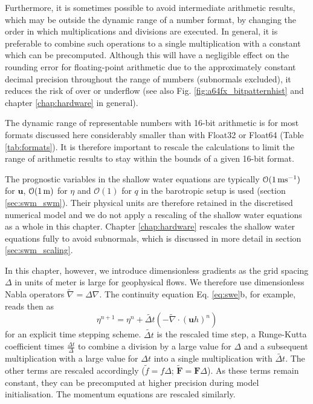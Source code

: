 Furthermore, it is sometimes possible to avoid intermediate arithmetic results, which may be outside the dynamic range of a number format,
by changing the order in which multiplications and divisions are executed. In general, it is preferable to combine such operations to a single
multiplication with a constant which can be precomputed. Although this will have a negligible effect on the rounding error for floating-point
arithmetic due to the approximately constant decimal precision throughout the range of numbers (subnormals excluded), it reduces the risk
of over or underflow (see also Fig. \ref{fig:a64fx_bitpatternhist} and chapter \ref{chap:hardware} in general).

The dynamic range of representable numbers with 16-bit arithmetic is for most formats discussed here considerably smaller than with
Float32 or Float64 (Table \ref{tab:formats}). It is therefore important to rescale the calculations to limit the range of arithmetic results to
stay within the bounds of a given 16-bit format.

The prognostic variables in the shallow water equations are typically $\mathcal{O}(1\operatorname{ms}^{-1})$ for $\mathbf{u}$, $\mathcal{O}(1\operatorname{m})$
for $\eta$ and $\mathcal{O}(1)$ for $q$ in the barotropic setup is used (section \ref{sec:swm_swm}). Their physical units are therefore retained
in the discretised numerical model and we do not apply a rescaling of the shallow water equations as a whole in this chapter. Chapter
\ref{chap:hardware} rescales the shallow water equations fully to avoid subnormals, which is discussed in more detail in section
\ref{sec:swm_scaling}.

In this chapter, however, we introduce dimensionless gradients as the grid spacing $\Delta$ in units of meter is large for geophysical flows.
We therefore use dimensionless Nabla operators $\tilde{\nabla} = \Delta\nabla$. The continuity equation Eq. \ref{eq:swe}b, for example,
reads then as
\begin{equation}
\eta^{n+1} = \eta^n + \tilde{\Delta t}\left( - \tilde{\nabla} \cdot (\mathbf{u}h)^n\right)
\label{eq:discr}
\end{equation}
for an explicit time stepping scheme. $\tilde{\Delta t}$ is the rescaled time step, a Runge-Kutta coefficient times $\tfrac{\Delta t}{\Delta}$ to
combine a division by a large value for $\Delta$ and a subsequent multiplication with a large value for $\Delta t$ into a single multiplication
with $\tilde{\Delta t}$. The other terms are rescaled accordingly ($\tilde{f} = f\Delta$; $\tilde{\mathbf{F}} = \mathbf{F}\Delta$). As these terms
remain constant, they can be precomputed at higher precision during model initialisation. The momentum equations are rescaled similarly.

